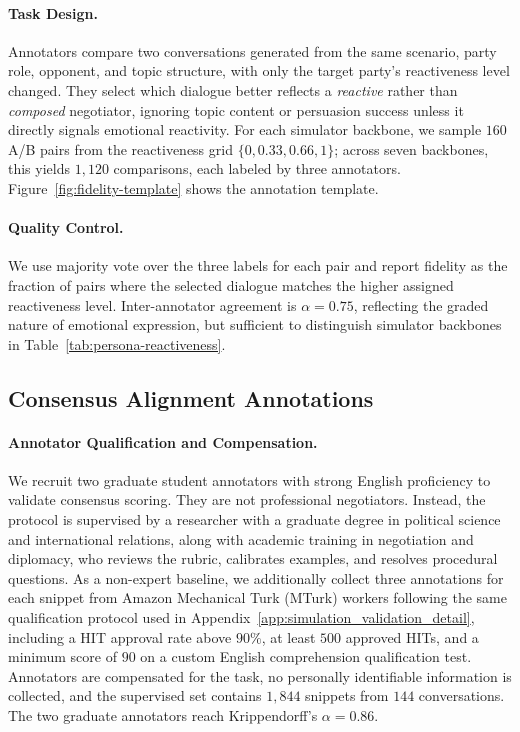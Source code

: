 \documentclass{llmxive}
\begin{document}
\paragraph{Task Design.}
Annotators compare two conversations generated from the same scenario, party role, opponent, and topic structure, with only the target party's reactiveness level changed. They select which dialogue better reflects a \emph{reactive} rather than \emph{composed} negotiator, ignoring topic content or persuasion success unless it directly signals emotional reactivity. For each simulator backbone, we sample $160$ A/B pairs from the reactiveness grid $\{0, 0.33, 0.66, 1\}$; across seven backbones, this yields $1{,}120$ comparisons, each labeled by three annotators. Figure~\ref{fig:fidelity-template} shows the annotation template.

\paragraph{Quality Control.}
We use majority vote over the three labels for each pair and report fidelity as the fraction of pairs where the selected dialogue matches the higher assigned reactiveness level. Inter-annotator agreement is $\alpha = 0.75$, reflecting the graded nature of emotional expression, but sufficient to distinguish simulator backbones in Table~\ref{tab:persona-reactiveness}.

\subsection{Consensus Alignment Annotations}
\label{app:evaluation_validation_detail}

\paragraph{Annotator Qualification and Compensation.}
We recruit two graduate student annotators with strong English proficiency to validate consensus scoring. They are not professional negotiators. Instead, the protocol is supervised by a researcher with a graduate degree in political science and international relations, along with academic training in negotiation and diplomacy, who reviews the rubric, calibrates examples, and resolves procedural questions. As a non-expert baseline, we additionally collect three annotations for each snippet from Amazon Mechanical Turk (MTurk) workers following the same qualification protocol used in Appendix~\ref{app:simulation_validation_detail}, including a HIT approval rate above $90\%$, at least $500$ approved HITs, and a minimum score of $90$ on a custom English comprehension qualification test. Annotators are compensated for the task, no personally identifiable information is collected, and the supervised set contains $1{,}844$ snippets from $144$ conversations. The two graduate annotators reach Krippendorff's $\alpha = 0.86$.
\end{document}
